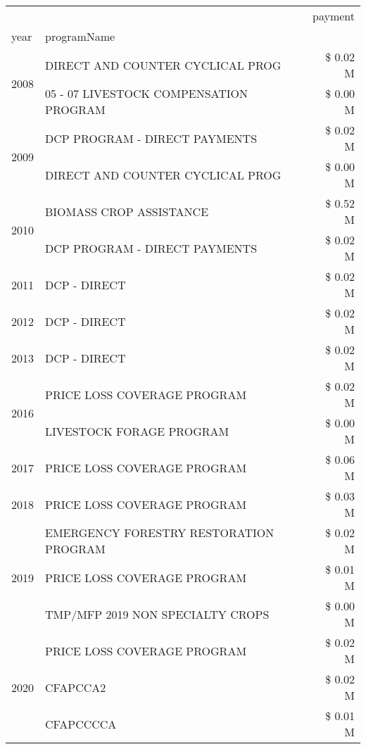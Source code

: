 \begin{tabular}{llr}
\toprule
 &  & payment \\
year & programName &  \\
\midrule
\multirow[t]{2}{*}{2008} & DIRECT AND COUNTER CYCLICAL PROG & \$ 0.02 M \\
 & 05 - 07 LIVESTOCK COMPENSATION PROGRAM & \$ 0.00 M \\
\cline{1-3}
\multirow[t]{2}{*}{2009} & DCP PROGRAM - DIRECT PAYMENTS & \$ 0.02 M \\
 & DIRECT AND COUNTER CYCLICAL PROG & \$ 0.00 M \\
\cline{1-3}
\multirow[t]{2}{*}{2010} & BIOMASS CROP ASSISTANCE & \$ 0.52 M \\
 & DCP PROGRAM - DIRECT PAYMENTS & \$ 0.02 M \\
\cline{1-3}
2011 & DCP - DIRECT & \$ 0.02 M \\
\cline{1-3}
2012 & DCP - DIRECT & \$ 0.02 M \\
\cline{1-3}
2013 & DCP - DIRECT & \$ 0.02 M \\
\cline{1-3}
\multirow[t]{2}{*}{2016} & PRICE LOSS COVERAGE PROGRAM & \$ 0.02 M \\
 & LIVESTOCK FORAGE PROGRAM & \$ 0.00 M \\
\cline{1-3}
2017 & PRICE LOSS COVERAGE PROGRAM & \$ 0.06 M \\
\cline{1-3}
2018 & PRICE LOSS COVERAGE PROGRAM & \$ 0.03 M \\
\cline{1-3}
\multirow[t]{3}{*}{2019} & EMERGENCY FORESTRY RESTORATION PROGRAM & \$ 0.02 M \\
 & PRICE LOSS COVERAGE PROGRAM & \$ 0.01 M \\
 & TMP/MFP 2019 NON SPECIALTY CROPS & \$ 0.00 M \\
\cline{1-3}
\multirow[t]{3}{*}{2020} & PRICE LOSS COVERAGE PROGRAM & \$ 0.02 M \\
 & CFAPCCA2 & \$ 0.02 M \\
 & CFAPCCCCA & \$ 0.01 M \\
\cline{1-3}
\bottomrule
\end{tabular}
